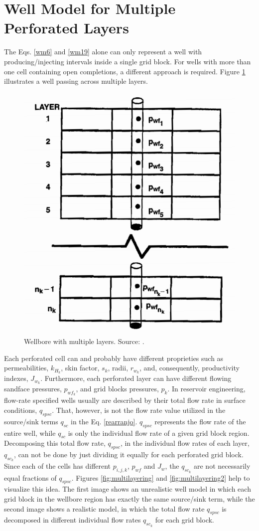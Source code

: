 \section{Well Model for Multiple Perforated Layers}
The Eqs. \ref{wm6} and \ref{wm19} alone can only represent a well with producing/injecting intervals inside a single grid block. For wells with more than one cell containing open completions, a different approach is required. Figure \ref{fig:22} illustrates a well passing across multiple layers. 
\begin{figure}[h]
	\centering
	\includegraphics[width=0.7\linewidth]{Images/22}
	\caption{Wellbore with multiple layers. Source: \cite{Ertekin2001}.}
	\label{fig:22}
\end{figure}
Each perforated cell can and probably have different proprieties such as permeabilities, $k_{H_k}$, skin factor, $s_k$, radii, $r_{w_k}$, and, consequently, productivity indexes, $J_{w_k}$. Furthermore, each perforated layer can have different flowing sandface pressures, $p_{{wf}_k}$, and grid blocks pressures, ${p_k}$. In reservoir engineering, flow-rate specified wells usually are described by their total flow rate in surface conditions, $q_{spsc}$. That, however, is not the flow rate value utilized in the source/sink terms $q_{sc}$ in the Eq. \ref{rearranjo}. $q_{spsc}$ represents the flow rate of the entire well, while $q_{sc}$ is only the individual flow rate of a given grid block region. Decomposing this total flow rate, $q_{spsc}$, in the individual flow rates of each layer, $q_{{sc}_k}$, can not be done by just dividing it equally for each perforated grid block. Since each of the cells has different $p_{i,j,k}$, $p_{wf}$ and $J_{w}$, the $q_{{sc}_k}$ are not necessarily equal fractions of $q_{spsc}$. Figures \ref{fig:multilayering} and \ref{fig:multilayering2} help to visualize this idea. The first image shows an unrealistic well model in which each grid block in the wellbore region has exactly the same source/sink term, while the second image shows a realistic model, in which the total flow rate $q_{spsc}$ is decomposed in different individual flow rates $q_{{sc}_k}$ for each grid block. 
